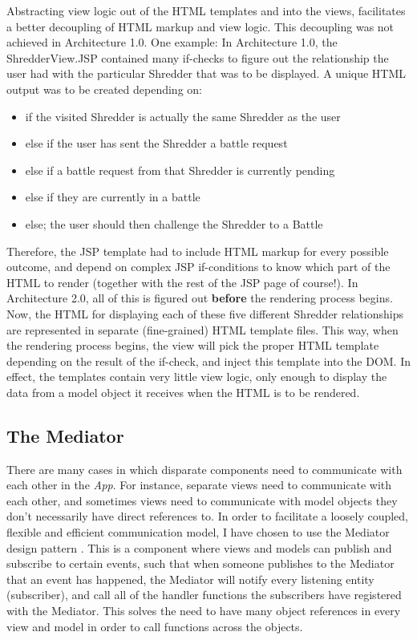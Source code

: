 Abstracting view logic out of the HTML templates and into the views, facilitates a better decoupling of HTML markup and view logic. This decoupling was not achieved in Architecture 1.0. One example: In Architecture 1.0, the ShredderView.JSP contained many if-checks to figure out the relationship the user had with the particular Shredder that was to be displayed. A unique HTML output was to be created depending on: 
\begin{itemize}
\item{} if the visited Shredder is actually the same Shredder as the user
\item{} else if the user has sent the Shredder a battle request
\item{} else if a battle request from that Shredder is currently pending
\item{} else if they are currently in a battle
\item{} else; the user should then challenge the Shredder to a Battle
\end{itemize}
Therefore, the JSP template had to include HTML markup for every possible outcome, and depend on complex JSP if-conditions to know which part of the HTML to render (together with the rest of the JSP page of course!). In Architecture 2.0, all of this is figured out \textbf{before} the rendering process begins. Now, the HTML for displaying each of these five different Shredder relationships are represented in separate (fine-grained) HTML template files. This way, when the rendering process begins, the view will pick the proper HTML template depending on the result of the if-check, and inject this template into the DOM. In effect, the templates contain very little view logic, only enough to display the data from a model object it receives when the HTML is to be rendered. 

\subsection{The Mediator}
There are many cases in which disparate components need to communicate with each other in the \textit{App}. For instance, separate views need to communicate with each other, and sometimes views need to communicate with model objects they don't necessarily have direct references to. In order to facilitate a loosely coupled, flexible and efficient communication model, I have chosen to use the Mediator design pattern
\cite[p. ~305]{facade}. This is a component where views and models can publish and subscribe to certain events, such that when someone publishes to the Mediator that an event has happened, the Mediator will notify every listening entity (subscriber), and call all of the handler functions the subscribers have registered with the Mediator. This solves the need to have many object references in every view and model in order to call functions across the objects.

